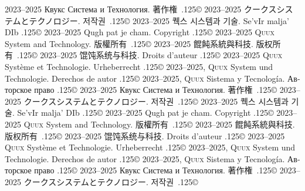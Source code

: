 \documentclass{cookbook}
\begin{document}
{{{	2023–2025 \foreignlanguage{russian}{Квукс Система и Технология.}
著作権~{\lower.125\baselineskip\hbox{\copyright}}
	2023--2025 クークスシステムとテクノロジー.
저작권~{\lower.125\baselineskip\hbox{\copyright}}
	2023--2025 퀙스 시스템과 기술.
Se'vIr malja' DIb {\lower.125\baselineskip\hbox{\copyright}} %
	2023--2025 Qugh pat je cham.
\texttt{{\gitabbrcommithash}}
Copyright {\lower.125\baselineskip\hbox{\copyright}}
	2023--2025 \textsc{Quux} System and Technology.
版權所有~{\lower.125\baselineskip\hbox{\copyright}}
	2023--2025 餛飩系統與科技.
版权所有~{\lower.125\baselineskip\hbox{\copyright}}
	2023--2025 馄饨系统与科技.
Droits d'auteur {\lower.125\baselineskip\hbox{\copyright}} %
	2023--2025 \textsc{Quux} Système et Technologie.
Urheberrecht {\lower.125\baselineskip\hbox{\copyright}} %
	2023--2025, \textsc{Quux} System und Technologie.
Derechos de autor {\lower.125\baselineskip\hbox{\copyright}} %
	2023--2025, \textsc{Quux} Sistema y Tecnología.
\foreignlanguage{russian}{Авторское право} %
	{\lower.125\baselineskip\hbox{\copyright}}
	2023–2025 \foreignlanguage{russian}{Квукс Система и Технология.}
著作権~{\lower.125\baselineskip\hbox{\copyright}}
	2023--2025 クークスシステムとテクノロジー.
저작권~{\lower.125\baselineskip\hbox{\copyright}}
	2023--2025 퀙스 시스템과 기술.
Se'vIr malja' DIb {\lower.125\baselineskip\hbox{\copyright}} %
	2023--2025 Qugh pat je cham.
\texttt{{\gitabbrcommithash}}
Copyright {\lower.125\baselineskip\hbox{\copyright}}
	2023--2025 \textsc{Quux} System and Technology.
版權所有~{\lower.125\baselineskip\hbox{\copyright}}
	2023--2025 餛飩系統與科技.
版权所有~{\lower.125\baselineskip\hbox{\copyright}}
	2023--2025 馄饨系统与科技.
Droits d'auteur {\lower.125\baselineskip\hbox{\copyright}} %
	2023--2025 \textsc{Quux} Système et Technologie.
Urheberrecht {\lower.125\baselineskip\hbox{\copyright}} %
	2023--2025, \textsc{Quux} System und Technologie.
Derechos de autor {\lower.125\baselineskip\hbox{\copyright}} %
	2023--2025, \textsc{Quux} Sistema y Tecnología.
\foreignlanguage{russian}{Авторское право} %
	{\lower.125\baselineskip\hbox{\copyright}}
	2023–2025 \foreignlanguage{russian}{Квукс Система и Технология.}
著作権~{\lower.125\baselineskip\hbox{\copyright}}
	2023--2025 クークスシステムとテクノロジー.
저작권~{\lower.125\baselineskip\hbox{\copyright}}
}}}
\end{document}
